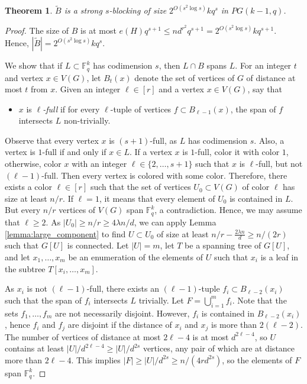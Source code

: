 \documentclass[11pt]{article}
\theoremstyle{plain}
\newtheorem{theorem}{Theorem}
\theoremstyle{definition}
\begin{document}
\begin{theorem}\label{thm:large_prime}
$\tilde{B}$ is a strong $s$-blocking of size $2^{O(s^2\log s)}kq^s$ in $PG(k-1,q)$.
\end{theorem}

\begin{proof}
The size of $B$ is at most $e(H)q^{s+1}\leq nd^{r^2} q^{s+1}=2^{O(s^2\log s)} k q^{s+1}.$ Hence, $|\tilde{B}|=2^{O(s^2\log s)} k q^{s}$.

We show that if $L\subset \mathbb{F}_q^k$ has codimension $s$, then $L\cap B$ spans $L$.  For an integer $t$ and vertex $x\in V(G)$, let $B_t(x)$ denote the set of vertices of $G$ of distance at most $t$ from $x$. Given an integer $\ell \in [r]$ and a vertex  $x\in V(G)$, say that 
\begin{itemize}
    \item[(i)] $x$ is \emph{$\ell$-full} if  for every $\ell$-tuple of vertices $f\subset B_{\ell-1}(x)$, the span of $f$ intersects $L$ non-trivially.
\end{itemize}
Observe that every vertex $x$ is $(s+1)$-full, as $L$ has codimension $s$. Also, a vertex is $1$-full if and only if $x\in L$. If a vertex $x$ is $1$-full, color it with color $1$, otherwise, color $x$ with an integer $\ell\in \{2,\dots,s+1\}$ such that $x$ is $\ell$-full, but not $(\ell-1)$-full. Then every vertex is colored with some color. Therefore, there exists a color $\ell\in [r]$ such that the set of vertices $U_0\subset V(G)$ of color $\ell$ has size at least $n/r$. If $\ell=1$, it means that every element of $U_0$ is contained in $L$. But every $n/r$ vertices of $V(G)$ span $\mathbb{F}_q^k$, a contradiction. Hence, we may assume that $\ell\geq 2$. As $|U_0|\geq n/r\geq 4\lambda n/d$, we can apply Lemma \ref{lemma:large_component} to find $U\subset U_0$ of size at least $n/r-\frac{2\lambda n}{d}\geq n/(2r)$ such that $G[U]$ is connected. Let $|U|=m$, let $T$ be a spanning tree of $G[U]$, and let $x_1,\dots,x_m$ be an enumeration of the elements of $U$ such that $x_i$ is a leaf in the subtree $T[x_i,\dots,x_m]$. 

As $x_i$ is not $(\ell-1)$-full, there exists an $(\ell-1)$-tuple  $f_i\subset B_{\ell-2}(x_i)$ such that the span of $f_i$ intersects $L$ trivially. Let $F=\bigcup_{i=1}^m  f_i$. Note that the sets $f_1,\dots,f_{m}$ are not necessarily disjoint. However, $f_i$ is contained in $B_{\ell-2}(x_i)$, hence $f_i$ and $f_j$ are disjoint if the distance of $x_i$ and $x_j$ is more than $2(\ell-2)$. The number of vertices of distance at most $2\ell-4$ is at most $d^{2\ell-4}$, so $U$ contains at least $|U|/d^{2\ell-4}\geq |U|/d^{2s}$ vertices, any pair of which are at distance more than $2\ell-4$. This implies $|F|\geq |U|/d^{2s}\geq n/(4rd^{2s})$, so the elements of $F$ span $\mathbb{F}_q^k$. 


\end{proof}
\end{document}
